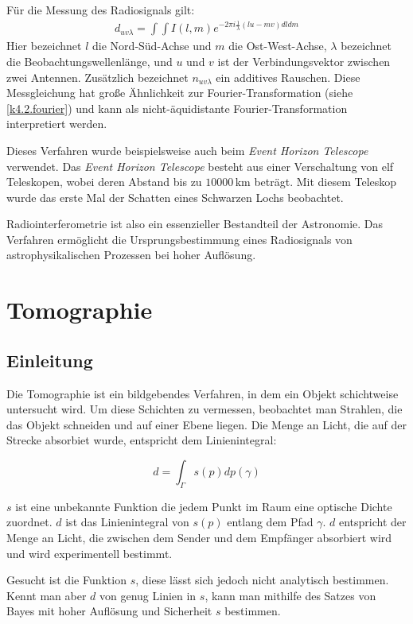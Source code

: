 \documentclass[]{dsadokumentation}
\begin{document}
Für die Messung des Radiosignals gilt:
\begin{eqnarray}
d_{uv\lambda} =\int\int I(l,m)e^{-2\pi i \frac{1}{\lambda}(lu-mv)dldm}
\end{eqnarray}
Hier bezeichnet $l$ die Nord-Süd-Achse und $m$ die Ost-West-Achse, $\lambda$ bezeichnet die Beobachtungswellenlänge, und $u$ und $v$ ist der Verbindungsvektor zwischen zwei Antennen. Zusätzlich bezeichnet $n_{uv\lambda}$ ein additives Rauschen. Diese Messgleichung hat große Ähnlichkeit zur Fourier-Transformation (siehe \cref{k4.2.fourier}) und kann als nicht-äquidistante Fourier-Transformation interpretiert werden.

Dieses Verfahren wurde beispielsweise auch beim \emph{Event Horizon Telescope} verwendet. Das \emph{Event Horizon Telescope} besteht aus einer Verschaltung von elf Teleskopen, wobei deren Abstand bis zu $10000\,\text{km}$ beträgt. Mit diesem Teleskop wurde das erste Mal der Schatten eines Schwarzen Lochs beobachtet.

Radiointerferometrie ist also ein essenzieller Bestandteil der Astronomie. Das Verfahren ermöglicht die Ursprungsbestimmung eines Radiosignals von astrophysikalischen Prozessen bei hoher Auflösung.



\section{Tomographie}\label{k4.2.comptomo.ct}
\subsection{Einleitung}

Die Tomographie ist ein bildgebendes Verfahren, in dem ein Objekt schichtweise untersucht wird. Um diese Schichten zu vermessen, beobachtet man Strahlen, die das Objekt schneiden und auf einer Ebene liegen. Die Menge an Licht, die auf der Strecke absorbiet wurde, entspricht dem Linienintegral:

$$d=\int_{\Gamma}{}s(p)dp(\gamma)$$

$s$ ist eine unbekannte Funktion die jedem Punkt im Raum eine optische Dichte zuordnet. $d$ ist das Linienintegral von $s(p)$ entlang dem Pfad $\gamma$. $d$ entspricht der Menge an Licht, die zwischen dem Sender und dem Empfänger absorbiert wird und wird experimentell bestimmt.

Gesucht ist die Funktion $s$, diese lässt sich jedoch nicht analytisch bestimmen. Kennt man aber $d$ von genug Linien in $s$, kann man mithilfe des Satzes von Bayes mit hoher Auflösung und Sicherheit $s$ bestimmen.
\end{document}
